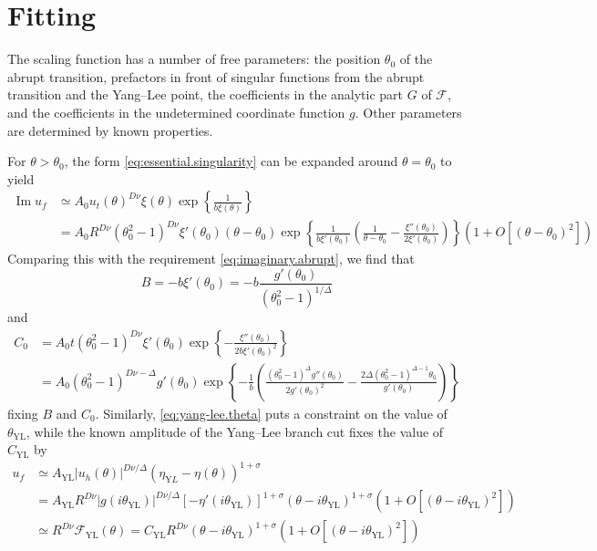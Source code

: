 \documentclass[
aps,
pre,
preprint,
longbibliography,
floatfix
]{revtex4-2}
\begin{document}
\section{Fitting}

The scaling function has a number of free parameters: the position $\theta_0$
of the abrupt transition, prefactors in front of singular functions from the
abrupt transition and the Yang--Lee point, the coefficients in the analytic
part $G$ of $\mathcal F$, and the coefficients in the undetermined coordinate
function $g$.  Other parameters are determined by known properties.

For $\theta>\theta_0$, the form \eqref{eq:essential.singularity} can be
expanded around $\theta=\theta_0$ to yield
\begin{equation}
  \begin{aligned}
    \operatorname{Im}u_f
    &\simeq A_0 u_t(\theta)^{D\nu}\xi(\theta)\exp\left\{\frac1{b\xi(\theta)}\right\} \\
    &=A_0R^{D\nu}(\theta_0^2-1)^{D\nu}\xi'(\theta_0)(\theta-\theta_0)
    \exp\left\{\frac1{b\xi'(\theta_0)}\left(\frac1{\theta-\theta_0}
      -\frac{\xi''(\theta_0)}{2\xi'(\theta_0)}\right)
      \right\}\left(1+O[(\theta-\theta_0)^2]\right)
  \end{aligned}
\end{equation}
Comparing this with the requirement \eqref{eq:imaginary.abrupt}, we find that
\begin{equation}
  B=-b\xi'(\theta_0)=-b\frac{g'(\theta_0)}{(\theta_0^2-1)^{1/\Delta}}
\end{equation}
and
\begin{equation}
  \begin{aligned}
    C_0&=A_0t(\theta_0^2-1)^{D\nu}\xi'(\theta_0)\exp\left\{
    -\frac{\xi''(\theta_0)}{2b\xi'(\theta_0)^2}
  \right\} \\
       &=
       A_0(\theta_0^2-1)^{D\nu-\Delta}g'(\theta_0)
       \exp\left\{-\frac1b\left(\frac{(\theta_0^2-1)^\Delta g''(\theta_0)}{2g'(\theta_0)^2}-\frac{2\Delta(\theta_0^2-1)^{\Delta - 1}\theta_0}{g'(\theta_0)}
       \right)\right\}
  \end{aligned}
\end{equation}
fixing $B$ and $C_0$. Similarly, \eqref{eq:yang-lee.theta} puts a constraint on
the value of $\theta_\mathrm{YL}$, while the known amplitude of the Yang--Lee
branch cut fixes the value of $C_\mathrm{YL}$ by
\begin{equation}
  \begin{aligned}
    u_f
    &\simeq A_\mathrm{YL}|u_h(\theta)|^{D\nu/\Delta}(\eta_{\mathrm YL}-\eta(\theta))^{1+\sigma} \\
    &=A_\mathrm{YL}R^{D\nu}|g(i\theta_\mathrm{YL})|^{D\nu/\Delta}[-\eta'(i\theta_\mathrm{YL})]^{1+\sigma}(\theta-i\theta_\mathrm{YL})^{1+\sigma}\left(1+O[(\theta-i\theta_\mathrm{YL})^2]\right)\\
    &\simeq R^{D\nu}\mathcal F_\mathrm{YL}(\theta)
    =C_\mathrm{YL}R^{D\nu}(\theta-i\theta_\mathrm{YL})^{1+\sigma}\left(1+O[(\theta-i\theta_\mathrm{YL})^2]\right)
\end{aligned}
\end{equation}
\end{document}
